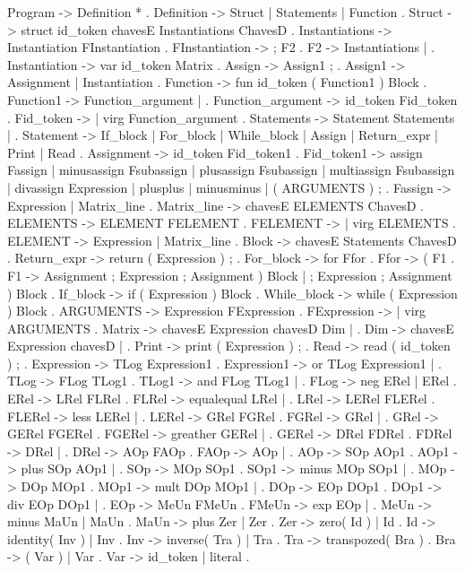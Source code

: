 Program ->   Definition * .
Definition ->    Struct |   Statements |   Function .
Struct ->    struct id_token chavesE Instantiations ChavesD .
Instantiations -> Instantiation FInstantiation .
FInstantiation -> ; F2 .
F2 -> Instantiations | \epsilon .
Instantiation -> var id_token Matrix .
Assign ->    Assign1 ; .
Assign1 ->   Assignment |   Instantiation .
Function ->  fun id_token ( Function1 ) Block .
Function1 -> Function_argument |   \epsilon .
Function_argument -> id_token Fid_token .
Fid_token -> \epsilon |   virg Function_argument .
Statements -> Statement Statements | \epsilon .
Statement -> If_block | For_block |   While_block |   Assign |   Return_expr |   Print |   Read .
Assignment ->    id_token Fid_token1 .
Fid_token1 ->    assign Fassign |   minusassign Fsubassign |   plusassign Fsubassign |   multiassign Fsubassign |   divassign Expression |   plusplus |   minusminus | ( ARGUMENTS ) ; .
Fassign ->   Expression |   Matrix_line .
Matrix_line ->   chavesE ELEMENTS ChavesD .
ELEMENTS ->  ELEMENT FELEMENT .
FELEMENT ->  \epsilon |   virg ELEMENTS .
ELEMENT ->   Expression |   Matrix_line .
Block -> chavesE Statements ChavesD .
Return_expr ->   return ( Expression ) ; .
For_block -> for Ffor .
Ffor ->  ( F1 .
F1 ->    Assignment ; Expression ; Assignment ) Block |   \epsilon ; Expression ; Assignment ) Block .
If_block ->  if ( Expression ) Block .
While_block ->   while ( Expression ) Block .
ARGUMENTS -> Expression FExpression .
FExpression -> \epsilon |   virg ARGUMENTS .
Matrix ->    chavesE Expression chavesD Dim | \epsilon.
Dim ->   chavesE Expression chavesD |   \epsilon .
Print -> print ( Expression ) ; .
Read ->  read ( id_token ) ; .
Expression ->    TLog Expression1 .
Expression1 ->   or TLog Expression1 | \epsilon    .
TLog ->  FLog TLog1 .
TLog1 -> and FLog TLog1 | \epsilon    .
FLog ->  neg ERel |   ERel .
ERel ->  LRel FLRel .
FLRel -> equalequal LRel | \epsilon    .
LRel ->  LERel FLERel .
FLERel ->    less LERel | \epsilon    .
LERel -> GRel FGRel .
FGRel -> \leq GRel | \epsilon    .
GRel ->  GERel FGERel .
FGERel ->    greather GERel | \epsilon    .
GERel -> DRel FDRel .
FDRel -> \geq DRel | \epsilon    .
DRel ->  AOp FAOp .
FAOp ->  \neq AOp | \epsilon    .
AOp ->   SOp AOp1 .
AOp1 ->  plus SOp AOp1 | \epsilon    .
SOp ->   MOp SOp1 .
SOp1 ->  minus MOp SOp1 | \epsilon    .
MOp ->   DOp MOp1 .
MOp1 ->  mult DOp MOp1 | \epsilon    .
DOp ->   EOp DOp1 .
DOp1 ->  div EOp DOp1 | \epsilon    .
EOp ->   MeUn FMeUn .
FMeUn -> exp EOp | \epsilon    .
MeUn ->  minus MaUn |   MaUn .
MaUn ->  plus Zer |   Zer .
Zer ->   zero( Id ) |   Id .
Id ->    identity( Inv ) |   Inv .
Inv ->   inverse( Tra ) |   Tra .
Tra ->   transpozed( Bra ) .
Bra ->   ( Var ) | Var .
Var ->   id_token | literal .